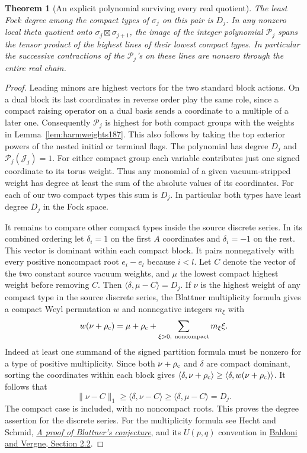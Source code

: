 \documentclass[a4paper,11pt]{article}
\newtheorem{theorem}[proposition]{Theorem}
\theoremstyle{definition}
\theoremstyle{remark}
\numberwithin{equation}{section}
\begin{document}
\begin{theorem}[An explicit polynomial surviving every real quotient]
\label{thm:harmonic187}
The least Fock degree among the compact types of \(\sigma_j\)
on this pair is \(D_j\). In any nonzero local theta quotient
onto \(\sigma_j\boxtimes\sigma_{j+1}\), the image of the
integer polynomial \(\mathcal P_j\) spans the tensor product of the
highest lines of their lowest compact types. In particular
the successive contractions of the \(\mathcal P_j\)'s on these lines
are nonzero through the entire real chain.
\end{theorem}
\begin{proof}
Leading minors are highest vectors for the two standard block
actions. On a dual block its last coordinates in reverse order
play the same role, since a compact raising operator on a dual
basis sends a coordinate to a multiple of a later one.
Consequently \(\mathcal P_j\) is highest for both compact groups with the
weights in Lemma~\ref{lem:harmweights187}. This also follows by
taking the top exterior powers of the nested initial or terminal
flags. The polynomial has degree \(D_j\) and
\(\mathcal P_j(\mathcal J_j)=1\). For either compact group each variable
contributes just one signed coordinate to its torus weight.
Thus any monomial of a given vacuum-stripped weight has degree
at least the sum of the absolute values of its coordinates.
For each of our two compact types this sum is \(D_j\). In
particular both types have least degree \(D_j\) in the Fock space.

It remains to compare other compact types inside the source
discrete series. In its combined ordering let \(\delta_i=1\)
on the first \(A\) coordinates and \(\delta_i=-1\) on the rest.
This vector is dominant within each compact block. It pairs
nonnegatively with every positive noncompact root \(e_i-e_l\)
because \(i<l\). Let \(C\) denote the vector of the two constant
source vacuum weights, and \(\mu\) the lowest compact highest
weight before removing \(C\). Then
\(\langle\delta,\mu-C\rangle=D_j\).
If \(\nu\) is the highest weight of any compact type in the
source discrete series, the Blattner multiplicity formula
gives a compact Weyl permutation \(w\) and nonnegative integers
\(m_\xi\) with
\[
 w(\nu+\rho_{\rm c})
      =\mu+\rho_{\rm c}+\sum_{\xi>0,\ {\rm noncompact}}m_\xi\xi .
\]
Indeed at least one summand of the signed partition formula
must be nonzero for a type of positive multiplicity.
Since both \(\nu+\rho_{\rm c}\) and \(\delta\) are compact
dominant, sorting the coordinates within each block gives
\(\langle\delta,\nu+\rho_{\rm c}\rangle
 \ge\langle\delta,w(\nu+\rho_{\rm c})\rangle\).
It follows that
\[
                \|\nu-C\|_1\ge\langle\delta,\nu-C\rangle
                      \ge\langle\delta,\mu-C\rangle=D_j .
\]
The compact case is included, with no noncompact roots.
This proves the degree assertion for the discrete series.
For the multiplicity formula see Hecht and Schmid,
\href{https://doi.org/10.1007/BF01404112}{\emph{A proof of
Blattner's conjecture}}, and its \(U(p,q)\) convention in
\href{https://webusers.imj-prg.fr/~michele.vergne/publications/discreteseries.pdf}{Baldoni
and Vergne, Section 2.2}.


\end{proof}
\end{document}
